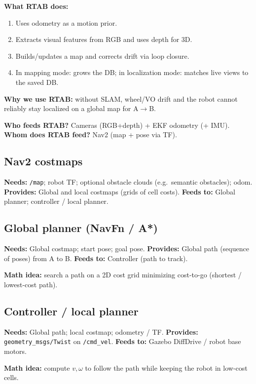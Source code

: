 \documentclass[11pt,a4paper]{article}
\newcommand{\needs}[1]{\textbf{Needs:} #1}
\newcommand{\provides}[1]{\textbf{Provides:} #1}
\newcommand{\feeds}[1]{\textbf{Feeds to:} #1}
\begin{document}
\textbf{What RTAB does:}
\begin{enumerate}[nosep,leftmargin=*]
  \item Uses odometry as a motion prior.
  \item Extracts visual features from RGB and uses depth for 3D.
  \item Builds/updates a map and corrects drift via loop closure.
  \item In mapping mode: grows the DB; in localization mode: matches live views to the saved DB.
\end{enumerate}

\textbf{Why we use RTAB:} without SLAM, wheel/VO drift and the robot cannot reliably stay localized on a global map for A$\rightarrow$B.

\textbf{Who feeds RTAB?} Cameras (RGB+depth) + EKF odometry (+ IMU).\\
\textbf{Whom does RTAB feed?} Nav2 (map + pose via TF).

\subsection{Nav2 costmaps}
\needs{\texttt{/map}; robot TF; optional obstacle clouds (e.g.\ semantic obstacles); odom.}
\provides{Global and local costmaps (grids of cell costs).}
\feeds{Global planner; controller / local planner.}

\subsection{Global planner (NavFn / A*)}
\needs{Global costmap; start pose; goal pose.}
\provides{Global path (sequence of poses) from A to B.}
\feeds{Controller (path to track).}

\textbf{Math idea:} search a path on a 2D cost grid minimizing cost-to-go (shortest / lowest-cost path).

\subsection{Controller / local planner}
\needs{Global path; local costmap; odometry / TF.}
\provides{\texttt{geometry\_msgs/Twist} on \texttt{/cmd\_vel}.}
\feeds{Gazebo DiffDrive / robot base motors.}

\textbf{Math idea:} compute $v,\omega$ to follow the path while keeping the robot in low-cost cells.
\end{document}
